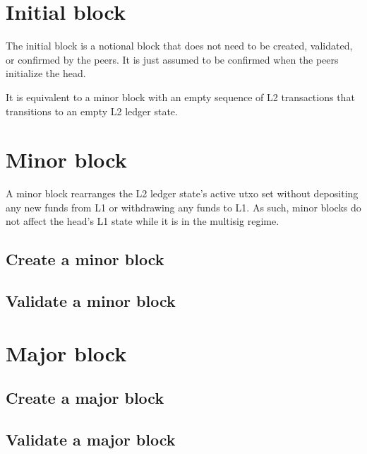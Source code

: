 \documentclass[../hydrozoa.tex]{subfiles}
\begin{document}
\section{Initial block}%
\label{h:l2-initial-block}%

The initial block is a notional block that does not need to be created, validated, or confirmed by the peers.
It is just assumed to be confirmed when the peers initialize the head.

It is equivalent to a minor block with an empty sequence of L2 transactions that transitions to an empty L2 ledger state.

\section{Minor block}%
\label{h:l2-minor-block}%

A minor block rearranges the L2 ledger state's active utxo set without depositing any new funds from L1 or withdrawing any funds to L1.
As such, minor blocks do not affect the head's L1 state while it is in the multisig regime.

\subsection{Create a minor block}%
\label{h:l2-minor-block-create}%


\subsection{Validate a minor block}%
\label{h:l2-minor-block-validate}%


\section{Major block}%
\label{h:l2-major-block}%


\subsection{Create a major block}%
\label{h:l2-major-block-create}%


\subsection{Validate a major block}%
\label{h:l2-major-block-validate}%
\end{document}
